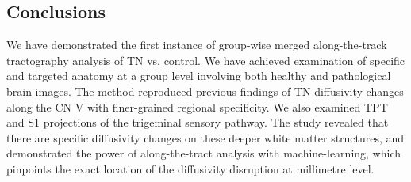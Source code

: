\subsection{Conclusions}
We have demonstrated the first instance of group-wise merged along-the-track tractography analysis of TN vs. control. We have achieved examination of specific and targeted anatomy at a group level involving both healthy and pathological brain images. The method reproduced previous findings of TN diffusivity changes along the CN V with finer-grained regional specificity. We also examined TPT and S1 projections of the trigeminal sensory pathway. The study revealed that there are specific diffusivity changes on these deeper white matter structures, and demonstrated the power of along-the-tract analysis with machine-learning, which pinpoints the exact location of the diffusivity disruption at millimetre level. 
